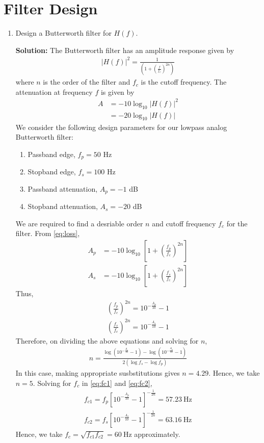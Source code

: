 \documentclass[journal,12pt,twocolumn]{IEEEtran}
\newcommand{\solution}{\noindent \textbf{Solution: }}
\providecommand{\brak}[1]{\ensuremath{\left(#1\right)}}
\providecommand{\sbrak}[1]{\ensuremath{\left[#1\right]}}
\providecommand{\abs}[1]{\left\vert#1\right\vert}
\numberwithin{equation}{section}
\numberwithin{figure}{section}
\renewcommand\thesection{\arabic{section}}
\begin{document}
\section{Filter Design}
\begin{enumerate}[label=\thesection.\arabic*
,ref=\thesection.\theenumi]
\item Design a Butterworth filter for $H(f)$.

\solution The Butterworth filter has an amplitude response
given by
\begin{align}
    \abs{H\brak{f}}^2 = \frac{1}{\brak{1 + \brak{\frac{f}{f_c}}^{2n}}}
\end{align}
where $n$ is the order of the filter and $f_c$ is the cutoff
frequency. The attenuation at frequency $f$ is given by 
\begin{align}
    A &= -10\log_{10}\abs{H\brak{f}}^2 \\
      &= -20\log_{10}\abs{H\brak{f}}
    \label{eq:loss}
\end{align}
We consider the following design parameters for our
lowpass analog Butterworth filter:
\begin{enumerate}
    \item Passband edge, $f_p = 50$ Hz
    \item Stopband edge, $f_s = 100$ Hz
    \item Passband attenuation, $A_p = -1$ dB
    \item Stopband attenuation, $A_s = -20$ dB
\end{enumerate}
We are required to find a desriable order $n$ and cutoff
frequency $f_c$ for the filter. From \eqref{eq:loss},
\begin{align}
    A_p &= -10\log_{10}\sbrak{1 + \brak{\frac{f_p}{f_c}}^{2n}} \\
    A_s &= -10\log_{10}\sbrak{1 + \brak{\frac{f_s}{f_c}}^{2n}}
\end{align}
Thus,
\begin{align}
    \brak{\frac{f_p}{f_c}}^{2n} = 10^{-\frac{A_p}{10}} - 1 \label{eq:fc1} \\
    \brak{\frac{f_s}{f_c}}^{2n} = 10^{-\frac{A_s}{10}} - 1 \label{eq:fc2}
\end{align}
Therefore, on dividing the above equations and solving for $n$,
\begin{align}
    n = \frac{\log\brak{10^{-\frac{A_s}{10}} - 1} - 
    \log\brak{10^{-\frac{A_p}{10}} - 1}}{2\brak{\log{f_s} - \log{f_p}}}
\end{align}
In this case, making appropriate susbstitutions gives $n = 4.29$.
Hence, we take $n = 5$. Solving for $f_c$ in \eqref{eq:fc1} and
\eqref{eq:fc2},
\begin{align}
    f_{c1} = f_p\sbrak{10^{-\frac{A_p}{10}} - 1}^{-\frac{1}{2n}} = \SI[parse-numbers=false]{57.23}{\hertz} \\
    f_{c2} = f_s\sbrak{10^{-\frac{A_s}{10}} - 1}^{-\frac{1}{2n}} = \SI[parse-numbers=false]{63.16}{\hertz}
\end{align}
Hence, we take $f_c = \sqrt{f_{c1}f_{c2}} = \SI[parse-numbers=false]{60}{\hertz}$ approximately.


\end{enumerate}
\end{document}
